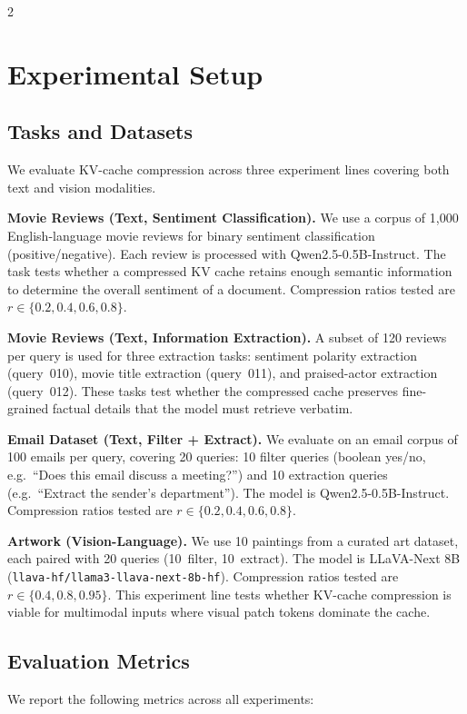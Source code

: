\documentclass[10pt,a4paper]{article}
\begin{document}
\begin{multicols}{2}
\section{Experimental Setup}

\subsection{Tasks and Datasets}

We evaluate KV-cache compression across three experiment lines covering
both text and vision modalities.

\textbf{Movie Reviews (Text, Sentiment Classification).}
We use a corpus of 1{,}000 English-language movie reviews for binary
sentiment classification (positive/negative). Each review is processed
with Qwen2.5-0.5B-Instruct. The task tests whether a compressed KV cache
retains enough semantic information to determine the overall sentiment of
a document. Compression ratios tested are
$r \in \{0.2, 0.4, 0.6, 0.8\}$.

\textbf{Movie Reviews (Text, Information Extraction).}
A subset of 120 reviews per query is used for three extraction tasks:
sentiment polarity extraction (query~010), movie title extraction
(query~011), and praised-actor extraction (query~012). These tasks test
whether the compressed cache preserves fine-grained factual details that
the model must retrieve verbatim.

\textbf{Email Dataset (Text, Filter + Extract).}
We evaluate on an email corpus of 100 emails per query, covering 20
queries: 10 filter queries (boolean yes/no, e.g.\ ``Does this email
discuss a meeting?'') and 10 extraction queries (e.g.\ ``Extract the
sender's department''). The model is Qwen2.5-0.5B-Instruct. Compression
ratios tested are $r \in \{0.2, 0.4, 0.6, 0.8\}$.

\textbf{Artwork (Vision-Language).}
We use 10 paintings from a curated art dataset, each paired with 20
queries (10~filter, 10~extract). The model is LLaVA-Next 8B
(\texttt{llava-hf/llama3-llava-next-8b-hf}). Compression ratios tested
are $r \in \{0.4, 0.8, 0.95\}$. This experiment line tests whether
KV-cache compression is viable for multimodal inputs where visual patch
tokens dominate the cache.

\subsection{Evaluation Metrics}

We report the following metrics across all experiments:


\end{multicols}
\end{document}

